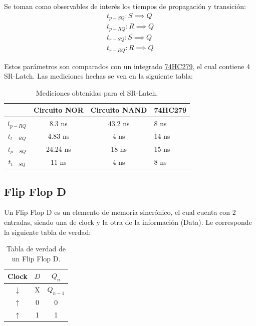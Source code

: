 Se toman como observables de interés los tiempos de propagación y transición:
\begin{equation*}
\begin{split}
	t_{p-SQ}: S \implies Q \\
	t_{p-RQ}: R \implies Q \\
	t_{r-SQ}: S \implies Q \\
	t_{r-RQ}: R \implies Q
\end{split}
\end{equation*}

Estos parámetros son comparados con un integrado \href{http://noel.feld.cvut.cz/hw/st/1937.pdf}{74HC279}, el cual contiene 4 SR-Latch. Las mediciones hechas se ven en la siguiente tabla:
\begin{table}[H]
\centering
\begin{tabular}{cccl}
\hline
\textit{}           & \textbf{Circuito NOR} & \textbf{Circuito NAND} & \textbf{74HC279} \\ \hline
\textbf{$t_{p-RQ}$} & 8.3 ns                 & 43.2 ns                 & 8 ns              \\
\textbf{$t_{t-RQ}$} & 4.83 ns                & 4 ns                    & 14 ns             \\
\textbf{$t_{p-SQ}$} & 24.24 ns               & 18 ns                   & 15 ns             \\
\textbf{$t_{t-SQ}$} & 11 ns                  & 4 ns                    & 8 ns             \\
\hline
\end{tabular}
\caption{Mediciones obtenidas para el SR-Latch.}
\label{tab:srl}
\end{table}

\subsection{Flip Flop D}

Un Flip Flop D es un elemento de memoria sincrónico, el cual cuenta con 2 entradas, siendo una de clock y la otra de la información (Data). Le corresponde la siguiente tabla de verdad:
\begin{table}[H]
\centering
\begin{tabular}{cc|c}
\hline
\textbf{Clock} & \textbf{$D$} & \textbf{$Q_n$} \\ \hline
$\downarrow$   & X            & $Q_{n-1}$      \\
$\uparrow$     & 0            & 0              \\
$\uparrow$     & 1            & 1             \\
\hline
\end{tabular}
\caption{Tabla de verdad de un Flip Flop D.}
\end{table}

